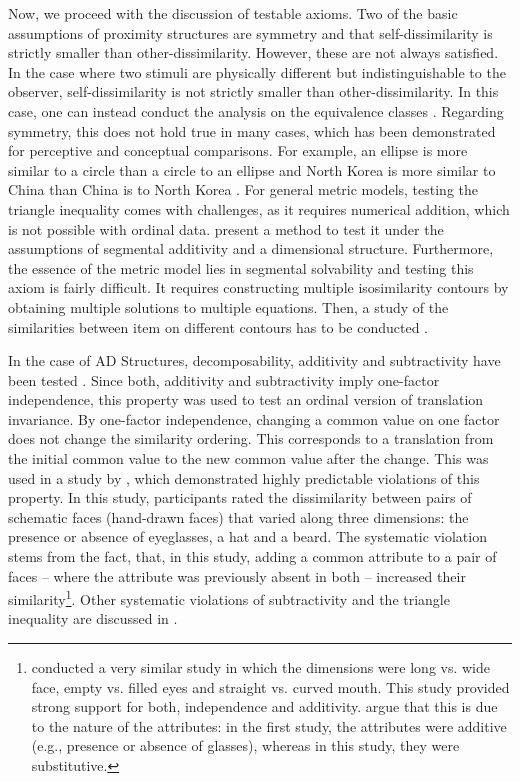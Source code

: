 Now, we proceed with the discussion of testable axioms.
Two of the basic assumptions of proximity structures are symmetry and that self-dissimilarity is strictly smaller than other-dissimilarity. However, these are not always satisfied.
In the case where two stimuli are physically different but indistinguishable to the observer, self-dissimilarity is not strictly smaller than other-dissimilarity. In this case, one can instead conduct the analysis on the equivalence classes \parencite[p. 161]{foundations2}.
Regarding symmetry, this does not hold true in many cases, which has been demonstrated for perceptive and conceptual comparisons. For example, an ellipse is more similar to a circle than a circle to an ellipse and North Korea is more similar to China than China is to North Korea \parencite{tverskyStudiesSimilarity1979, tverskyFeaturesSimilarity1977a}.
For general metric models, testing the triangle inequality comes with challenges, as it requires numerical addition, which is not possible with ordinal data. \textcite[pp. 205-207]{foundations2} present a method to test it under the assumptions of segmental additivity and a dimensional structure.
Furthermore, the essence of the metric model lies in segmental solvability and testing this axiom is fairly difficult. It requires constructing multiple isosimilarity contours by obtaining multiple solutions to multiple equations. Then, a study of the similarities between item on different contours has to be conducted \parencite[p. 165]{foundations2, foundationsMDS}.

In the case of AD Structures, decomposability, additivity and subtractivity have been tested \parencite{tverskySimilaritySchematicFaces1969, wenderTestIndependenceDimensions1971, krantzSimilarityRectanglesAnalysis1975}.
Since both, additivity and subtractivity imply one-factor independence, this property  was used to test an ordinal version of translation invariance.
By one-factor independence, changing a common value on one factor does not change the similarity ordering. This corresponds to a translation from the initial common value to the new common value after the change.
This was used in a study by \textcite{gatiWeightingCommonDistinctive1984}, which demonstrated highly predictable violations of this property.
In this study, participants rated the dissimilarity between pairs of schematic faces (hand-drawn faces) that varied along three dimensions: the presence or absence of eyeglasses, a hat and a beard.
The systematic violation stems from the fact, that, in this study, adding a common attribute to a pair of faces  -- where the attribute was previously absent in both -- increased their similarity\footnote{\textcite{tverskySimilaritySchematicFaces1969} conducted a very similar study in which the dimensions were long vs. wide face, empty vs. filled eyes and straight vs. curved mouth. This study provided strong support for both, independence and additivity. \textcite[p. 204]{foundations2} argue that this is due to the nature of the attributes: in the first study, the attributes were additive (e.g., presence or absence of glasses), whereas in this study, they were substitutive.}.
Other systematic violations of subtractivity and the triangle inequality are discussed in \textcite[pp. 200-207]{foundations2}.

